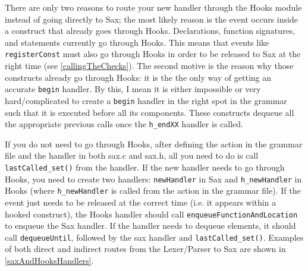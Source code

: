 \documentclass[12pt]{report}
\begin{document}
There are only two reasons to route your new handler through the Hooks module instead of going 
directly to Sax; the most likely reason is the event occurs inside a construct that already goes through 
Hooks. Declarations, function signatures, and statements currently go through Hooks. This means that 
events like \lstinline{registerConst} must also go through Hooks in order to be released to Sax at the right 
time (see \autoref{callingTheChecks}). The second motive is the reason why those constructs 
already go through Hooks:  it is the the only way of getting an accurate \lstinline{begin} handler. By this, I 
mean it is either impossible or very hard\slash complicated to create a \lstinline{begin} handler in the 
right spot in the grammar such that it is executed before all its components. These constructs dequeue all 
the appropriate previous calls once the \lstinline{h_endXX} handler is called.

If you do not need to go through Hooks, after defining the action in the grammar file and the handler in 
both sax.c and sax.h, all you need to do is call \lstinline{lastCalled_set()} from the handler. If the new 
handler needs to go through Hooks, you need to create two handlers: \lstinline{newHandler} in Sax and 
\lstinline{h_newHandler} in Hooks (where \lstinline{h_newHandler} is called from the action in the 
grammar file). If the event just needs to be released at the correct time (i.e. it appears within a hooked 
construct), the Hooks handler should call \lstinline{enqueueFunctionAndLocation} to enqueue the Sax 
handler. If the handler needs to dequeue elements, it should call \lstinline{dequeueUntil}, followed by the 
sax handler and \lstinline{lastCalled_set()}. Examples of both direct and indirect routes from the 
Lexer\slash Parser to Sax are shown in \autoref{saxAndHooksHandlers}.
\end{document}
